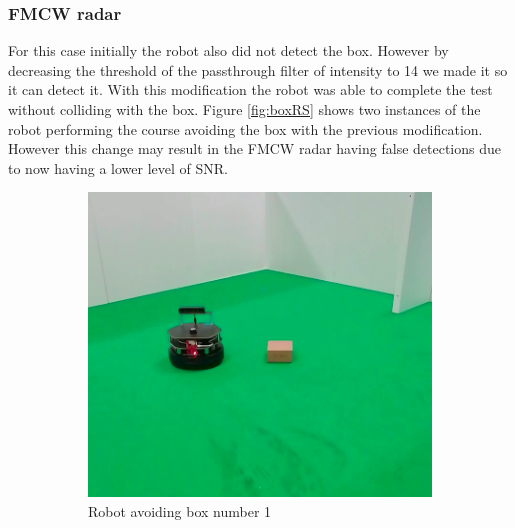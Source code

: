 \subsubsection*{FMCW radar}
For this case initially the robot also did not detect the box. However by decreasing the threshold of the passthrough filter of intensity to 14 we made it so it can detect it. With this modification the robot was able to complete the test without colliding with the box. Figure \ref{fig:boxRS} shows two instances of the robot performing the course avoiding the box with the previous modification. However this change may result in the \ac{FMCW} \ac{radar} having false detections due to now having a lower level of \ac{SNR}.

\begin{figure}[ht!]
  \centering
  \begin{subfigure}[b]{0.4\linewidth}
    \includegraphics[width=\linewidth]{imgs/chapter5/boxRS.png}
     \caption{Robot avoiding box number 1}
     \label{fig:boxRS1}
  \end{subfigure}
  \begin{subfigure}[b]{0.38\linewidth}

\end{subfigure}
\end{figure}
